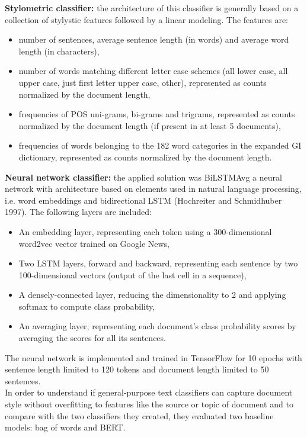 \documentclass[10pt, english]{report}
\begin{document}
\textbf{Stylometric classifier:} the architecture of this classifier is generally based on a collection of stylystic features followed by a linear modeling. The features are: 
	\begin{itemize}
	\item number of sentences, average sentence length (in words) and average word length (in characters),
	\item number of words matching different letter case schemes (all lower case, all upper case, just first letter upper case, other), represented as counts normalized by the document length,
	\item frequencies of POS uni-grams, bi-grams and trigrams, represented as counts normalized by the document length (if present in at least 5 documents),
	\item frequencies of words belonging to the 182 word categories in the expanded GI dictionary, represented as counts normalized by the document length.
	\end{itemize}

\textbf{Neural network classifier:} the applied solution was BiLSTMAvg a neural network with architecture based on elements used in natural language processing, i.e. word embeddings \cite{mikolov2013efficient} and bidirectional LSTM (Hochreiter and Schmidhuber 1997). The following layers are included:
	\begin{itemize}
	\item An embedding layer, representing each token using a 300-dimensional word2vec vector trained on Google News,
	\item Two LSTM layers, forward and backward, representing each sentence by two 100-dimensional vectors (output of the last cell in a sequence),
	\item A densely-connected layer, reducing the dimensionality to 2 and applying softmax to compute class probability,
	\item An averaging layer, representing each document’s class probability scores by averaging the scores for all its sentences.
	\end{itemize}
The neural network is implemented and trained in TensorFlow for 10 epochs with sentence length limited to 120 tokens and document length limited to 50 sentences.\\

In order to understand if general-purpose text classifiers can capture document style without overfitting to features like the source or topic of document and to compare with the two classifiers they created, they evaluated two baseline models: bag of words and BERT.\\
\end{document}
